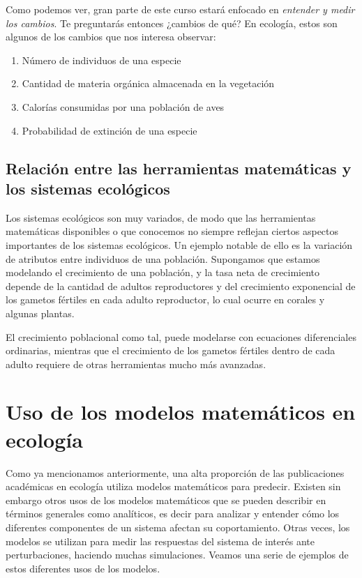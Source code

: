 \documentclass[
]{book}
\providecommand{\tightlist}{%
  \setlength{\itemsep}{0pt}\setlength{\parskip}{0pt}}
\begin{document}
Como podemos ver, gran parte de este curso estará enfocado en \emph{entender y medir los cambios}. Te preguntarás entonces ¿cambios de qué? En ecología, estos son algunos de los cambios que nos interesa observar:

\begin{enumerate}
\def\labelenumi{\arabic{enumi}.}
\tightlist
\item
  Número de individuos de una especie
\item
  Cantidad de materia orgánica almacenada en la vegetación
\item
  Calorías consumidas por una población de aves
\item
  Probabilidad de extinción de una especie
\end{enumerate}

\hypertarget{relaciuxf3n-entre-las-herramientas-matemuxe1ticas-y-los-sistemas-ecoluxf3gicos}{%
\subsection{Relación entre las herramientas matemáticas y los sistemas ecológicos}\label{relaciuxf3n-entre-las-herramientas-matemuxe1ticas-y-los-sistemas-ecoluxf3gicos}}

Los sistemas ecológicos son muy variados, de modo que las herramientas matemáticas disponibles o que conocemos no siempre reflejan ciertos aspectos importantes de los sistemas ecológicos. Un ejemplo notable de ello es la variación de atributos entre individuos de una población. Supongamos que estamos modelando el crecimiento de una población, y la tasa neta de crecimiento depende de la cantidad de adultos reproductores y del crecimiento exponencial de los gametos fértiles en cada adulto reproductor, lo cual ocurre en corales y algunas plantas.

El crecimiento poblacional como tal, puede modelarse con ecuaciones diferenciales ordinarias, mientras que el crecimiento de los gametos fértiles dentro de cada adulto requiere de otras herramientas mucho más avanzadas.

\hypertarget{uso-de-los-modelos-matemuxe1ticos-en-ecologuxeda}{%
\section{Uso de los modelos matemáticos en ecología}\label{uso-de-los-modelos-matemuxe1ticos-en-ecologuxeda}}

Como ya mencionamos anteriormente, una alta proporción de las publicaciones académicas en ecología utiliza modelos matemáticos para predecir. Existen sin embargo otros usos de los modelos matemáticos que se pueden describir en términos generales como analíticos, es decir para analizar y entender cómo los diferentes componentes de un sistema afectan su coportamiento. Otras veces, los modelos se utilizan para medir las respuestas del sistema de interés ante perturbaciones, haciendo muchas simulaciones. Veamos una serie de ejemplos de estos diferentes usos de los modelos.
\end{document}

